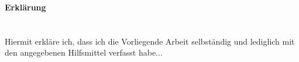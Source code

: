 
\Large{\textbf{Erklärung}}\\
%
%
\\
\\
\normalsize
Hiermit erkläre ich, dass ich die Vorliegende Arbeit selbständig und lediglich mit den angegebenen Hilfsmittel verfasst habe...
%
\newpage
